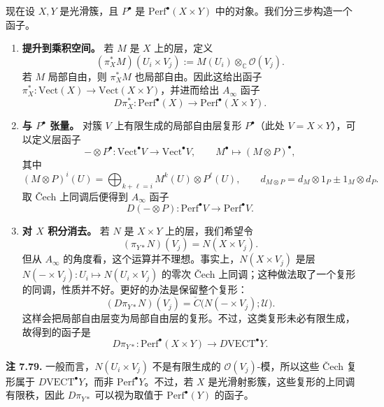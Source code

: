 现在设 $X,Y$ 是光滑簇，且 $P^{\bullet}$ 是 $\mathrm{Perf}^{\bullet}(X\times Y)$ 中的对象。我们分三步构造一个函子。
\begin{enumerate}[label=(\roman*)]
  \item \textbf{提升到乘积空间。} 若 $M$ 是 $X$ 上的层，定义
  \[
    (\pi_X^*M)(U_i\times V_j):=M(U_i)\otimes_{\mathbb C}\mathcal O(V_j).
  \]
  若 $M$ 局部自由，则 $\pi_X^*M$ 也局部自由。因此这给出函子 $\pi_X^*\colon\mathrm{Vect}(X)\to\mathrm{Vect}(X\times Y)$，并进而给出 $A_\infty$ 函子
  \[
    D\pi_X^*\colon\mathrm{Perf}^{\bullet}(X)\to\mathrm{Perf}^{\bullet}(X\times Y).
  \]
  \item \textbf{与 $P^{\bullet}$ 张量。} 对簇 $V$ 上有限生成的局部自由层复形 $P^{\bullet}$（此处 $V=X\times Y$），可以定义层函子
  \[
    -\otimes P^{\bullet}\colon\mathrm{Vect}^{\bullet}V\longrightarrow\mathrm{Vect}^{\bullet}V,
    \qquad M^{\bullet}\longmapsto(M\otimes P)^{\bullet},
  \]
  其中
  \[
    (M\otimes P)^i(U)=\bigoplus_{k+\ell=i}M^k(U)\otimes P^{\ell}(U),
    \qquad d_{M\otimes P}=d_M\otimes1_P\pm1_M\otimes d_P.
  \]
  取 Čech 上同调后便得到 $A_\infty$ 函子
  \[
    D(-\otimes P)\colon\mathrm{Perf}^{\bullet}V\to\mathrm{Perf}^{\bullet}V.
  \]
  \item \textbf{对 $X$ 积分消去。} 若 $N$ 是 $X\times Y$ 上的层，我们希望令
  \[
    (\pi_{Y*}N)(V_j)=N(X\times V_j).
  \]
  但从 $A_\infty$ 的角度看，这个运算并不理想。事实上，$N(X\times V_j)$ 是层 $N(-\times V_j)\colon U_i\mapsto N(U_i\times V_j)$ 的零次 Čech 上同调；这种做法取了一个复形的同调，性质并不好。更好的办法是保留整个复形：
  \[
    (D\pi_{Y*}N)(V_j)=\check C\bigl(N(-\times V_j);\mathcal U\bigr).
  \]
  这样会把局部自由层变为局部自由层的复形。不过，这类复形未必有限生成，故得到的函子是
  \[
    D\pi_{Y*}\colon\mathrm{Perf}^{\bullet}(X\times Y)\to D\mathrm{VECT}^{\bullet}Y.
  \]
\end{enumerate}

\begin{note}\label{note:pushforward-perfect}
\textbf{注 7.79.} 一般而言，$N(U_i\times V_j)$ 不是有限生成的 $\mathcal O(V_j)$-模，所以这些 Čech 复形属于 $D\mathrm{VECT}^{\bullet}Y$，而非 $\mathrm{Perf}^{\bullet}Y$。不过，若 $X$ 是光滑射影簇，这些复形的上同调有限秩，因此 $D\pi_{Y*}$ 可以视为取值于 $\mathrm{Perf}^{\bullet}(Y)$ 的函子。
\end{note}

